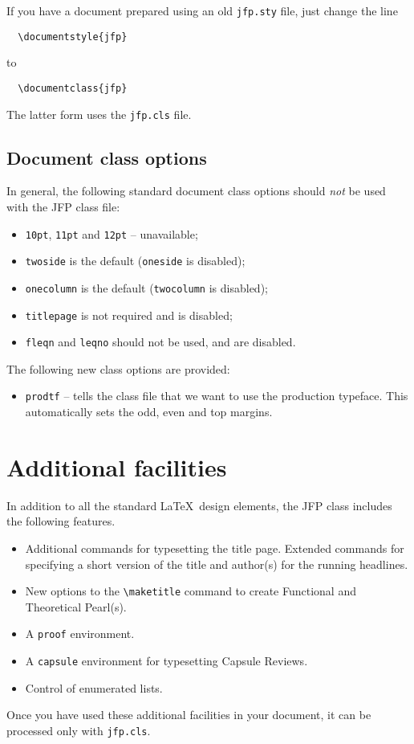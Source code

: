 \documentclass{jfp}
\begin{document}
If you have a document prepared using an old \verb"jfp.sty" file,
just change the line
\begin{verbatim}
  \documentstyle{jfp}
\end{verbatim}
to
\begin{verbatim}
  \documentclass{jfp}
\end{verbatim}
The latter form uses the \verb"jfp.cls" file.

\subsection{Document class options}\label{sec:ClassOp}

In general, the following standard document class options should \emph{not} be
used with the JFP class file:
%
\begin{itemize}
  \item \texttt{10pt}, \texttt{11pt} and \texttt{12pt} -- unavailable;
  \item \texttt{twoside} is the default (\texttt{oneside} is disabled);
  \item \texttt{onecolumn} is the default (\texttt{twocolumn} is disabled);
  \item \texttt{titlepage} is not required and is disabled;
  \item \texttt{fleqn} and \texttt{leqno} should not be used, and are disabled.
\end{itemize}
%
\ifprodtf
The following new class options are provided:
\begin{itemize}
  \item \texttt{prodtf} -- tells the class file that we want to use the
    production typeface. This automatically sets the odd, even and top
    margins.
\end{itemize}
\fi

\section{Additional facilities}

In addition to all the standard \LaTeX\ design elements, the JFP class
includes the following features.
%
\begin{itemize}
  \item Additional commands for typesetting the title page. Extended
        commands for specifying a short version of the title and author(s)
        for the running headlines.
  \item New options to the \verb"\maketitle" command to create Functional and
        Theoretical Pearl(s).
  \item A \verb"proof" environment.
  \item A \verb"capsule" environment for typesetting Capsule Reviews.
  \item Control of enumerated lists.
\end{itemize}
%
Once you have used these additional facilities in your document,
it can be processed only with \verb"jfp.cls".
\end{document}
